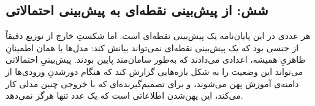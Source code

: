 \subsection*{شش: از پیش‌بینی نقطه‌ای به پیش‌بینی احتمالاتی}

هر عددی در این پایان‌نامه یک پیش‌بینی نقطه‌ای است. اما شکستِ خارج از توزیع دقیقاً
از جنسی بود که یک پیش‌بینی نقطه‌ای نمی‌تواند بیانش کند: مدل‌ها با همان اطمینانِ
ظاهریِ همیشه، اعدادی می‌دادند که به‌طور سامان‌مند پایین بودند. پیش‌بینیِ
احتمالاتی \cite{ziel_probabilistic_2018} می‌تواند این وضعیت را به شکل بازه‌هایی
گزارش کند که هنگام دورشدنِ ورودی‌ها از دامنه‌ی آموزش پهن می‌شوند، و برای
تصمیم‌گیرنده‌ای که با خروجی چنین مدلی کار می‌کند، این پهن‌شدن اطلاعاتی است که
یک عدد تنها هرگز نمی‌دهد.
